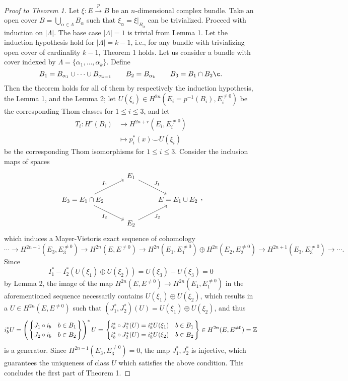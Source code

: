 \documentclass[10pt]{article}
\begin{document}
\begin{proof}[Proof to Theorem 1]
Let $\xi:E\overset{p}{\to}B$ be an $n$-dimensional complex bundle. Take an open cover $B=\bigcup_{\alpha\in\Lambda}B_\alpha$ such that $\xi_\alpha=\xi\big|_{B_\alpha}$ can be trivialized. Proceed with induction on $|\Lambda|$. The base case $|\Lambda|=1$ is trivial from Lemma 1. Let the induction hypothesis hold for $|\Lambda|=k-1$, i.e., for any bundle with trivializing open cover of cardinality $k-1$, Theorem 1 holds. Let us consider a bundle with cover indexed by $\Lambda=\{\alpha_1,\dots,\alpha_k\}$. Define
$$B_1=B_{\alpha_1}\cup\cdots\cup B_{\alpha_{k-1}}\quad\quad B_2=B_{\alpha_k}\quad\quad B_3=B_1\cap B_2\c.$$ Then the theorem holds for all of them by respectively the induction hypothesis, the Lemma 1, and the Lemma 2; let $U(\xi_i)\in H^{2n}(E_i=p^{-1}(B_i),E_i^{\neq0})$ be the corresponding Thom classes for $1\leq i\leq 3$, and let
\begin{align*}
T_i:H^r(B_i)&\to H^{2n+r}(E_i,E_i^{\neq0})\\
&\mapsto p_i^*(x)\smile U(\xi_i)
\end{align*}
be the corresponding Thom isomorphisms for $1\leq i\leq 3$.
Consider the inclusion maps of spaces
$$
\begin{tikzcd}
                                                     & E_1 \arrow[rd, "J_1"]  &               \\
E_3=E_1\cap E_2 \arrow[ru, "I_1"] \arrow[rd, "I_2"'] &                        & E=E_1\cup E_2 \\
                                                     & E_2 \arrow[ru, "J_2"'] &
\end{tikzcd},
$$
which induces a Mayer-Vietoris exact sequence of cohomology
$$\cdots\to H^{2n-1}(E_3,E_3^{\neq0})\to H^{2n}(E,E^{\neq0})\to H^{2n}(E_1,E_1^{\neq0})\oplus H^{2n}(E_2,E_2^{\neq0})\to H^{2n+1}(E_3,E_3^{\neq0})\to\cdots.$$
Since
$$I_1^*-I_2^*(U(\xi_1)\oplus U(\xi_2))=U(\xi_3)-U(\xi_3)=0$$
by Lemma 2, the image of the map $H^{2n}(E,E^{\neq0})\to H^{2n}(E_1,E_1^{\neq0})$ in the aforementioned sequence necessarily contains $U(\xi_1)\oplus U(\xi_2)$, which results in a $U\in H^{2n}(E,E^{\neq0})$ such that $(J_1^*,J_2^*)(U)=U(\xi_1)\oplus U(\xi_2)$, and thus $$i_b^*U=\left(\begin{rcases}\begin{cases}J_1\circ i_b&b\in B_1\\J_2\circ i_b&b\in B_2\end{cases}\end{rcases}\right)^*U=\begin{rcases}\begin{cases}i_b^*\circ J_1^*(U)=i_b^*U(\xi_1)&b\in B_1\\i_b^*\circ J_2^*(U)=i_b^*U(\xi_2)&b\in B_2\end{cases}\end{rcases}\in H^{2n}(E,E^{\neq0})=\mathbb{Z}$$ is a generator.
Since $H^{2n-1}(E_3,E_3^{\neq0})=0$, the map $J_1^*,J_2^*$ is injective, which guarantees the uniqueness of class $U$ which satisfies the above condition. This concludes the first part of Theorem 1.
\end{proof}
\end{document}
